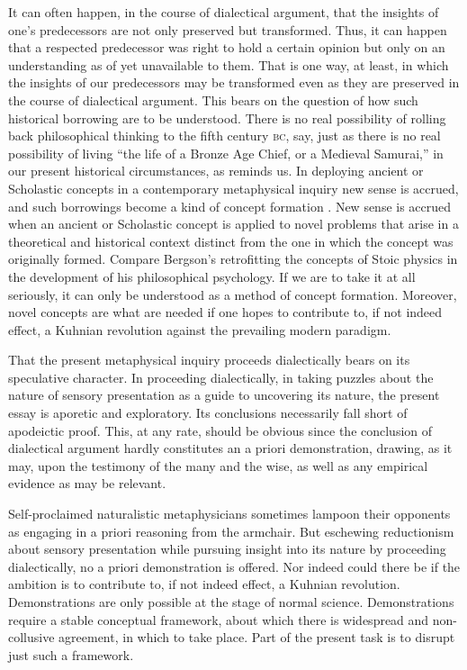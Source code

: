 It can often happen, in the course of dialectical argument, that the insights of one's predecessors are not only preserved but transformed. Thus, it can happen that a respected predecessor was right to hold a certain opinion but only on an understanding as of yet unavailable to them. That is one way, at least, in which the insights of our predecessors may be transformed even as they are preserved in the course of dialectical argument. This bears on the question of how such historical borrowing are to be understood. There is no real possibility of rolling back philosophical thinking to the fifth century \textsc{bc}, say, just as there is no real possibility of living ``the life of a Bronze Age Chief, or a Medieval Samurai,'' in our present historical circumstances, as \citet[140]{Williams:1981rt} reminds us. In deploying ancient or Scholastic concepts in a contemporary metaphysical inquiry new sense is accrued, and such borrowings become a kind of concept formation \citep[587--8]{Moore:2012aa}. New sense is accrued when an ancient or Scholastic concept is applied to novel problems that arise in a theoretical and historical context distinct from the one in which the concept was originally formed. Compare Bergson's \citeyearpar{Bergson:1912pi} retrofitting the concepts of Stoic physics in the development of his philosophical psychology. If we are to take it at all seriously, it can only be understood as a method of concept formation. Moreover, novel concepts are what are needed if one hopes to contribute to, if not indeed effect, a Kuhnian revolution against the prevailing modern paradigm.

That the present metaphysical inquiry proceeds dialectically bears on its speculative character. In proceeding dialectically, in taking puzzles about the nature of sensory presentation as a guide to uncovering its nature, the present essay is aporetic and exploratory. Its conclusions necessarily fall short of apodeictic proof. This, at any rate, should be obvious since the conclusion of dialectical argument hardly constitutes an a priori demonstration, drawing, as it may, upon the testimony of the many and the wise, as well as any empirical evidence as may be relevant. 

Self-proclaimed naturalistic metaphysicians sometimes lampoon their opponents as engaging in a priori reasoning from the armchair. But eschewing reductionism about sensory presentation while pursuing insight into its nature by proceeding dialectically, no a priori demonstration is offered. Nor indeed could there be if the ambition is to contribute to, if not indeed effect, a Kuhnian revolution. Demonstrations are only possible at the stage of normal science. Demonstrations require a stable conceptual framework, about which there is widespread and non-collusive agreement, in which to take place. Part of the present task is to disrupt just such a framework.

